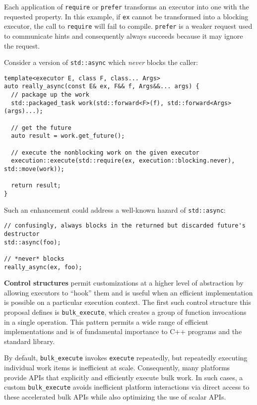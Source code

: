 \documentclass[a4paper,12pt,notitlepage,twoside,openright]{article}
\begin{document}
Each application of \texttt{require} or
\texttt{prefer} transforms an executor into one with the
requested property. In this example, if \texttt{ex} cannot
be transformed into a blocking executor, the call to
\texttt{require} will fail to compile.
\texttt{prefer} is a weaker request used to communicate
hints and consequently always succeeds because it may ignore the
request.

Consider a version of \texttt{std::async} which \emph{never}
blocks the caller:

\begin{verbatim}
template<executor E, class F, class... Args>
auto really_async(const E& ex, F&& f, Args&&... args) {
  // package up the work
  std::packaged_task work(std::forward<F>(f), std::forward<Args>(args)...);

  // get the future
  auto result = work.get_future();

  // execute the nonblocking work on the given executor
  execution::execute(std::require(ex, execution::blocking.never), std::move(work));

  return result;
}
\end{verbatim}

Such an enhancement could address a well-known hazard of
\texttt{std::async}:

\begin{verbatim}
// confusingly, always blocks in the returned but discarded future's destructor
std::async(foo);

// *never* blocks
really_async(ex, foo);
\end{verbatim}

\textbf{Control structures} permit customizations at a higher level of
abstraction by allowing executors to ``hook'' them and is useful when an
efficient implementation is possible on a particular execution context.
The first such control structure this proposal defines is
\texttt{bulk_execute}, which creates a group of function
invocations in a single operation. This pattern permits a wide range of
efficient implementations and is of fundamental importance to C++
programs and the standard library.

By default, \texttt{bulk_execute} invokes
\texttt{execute} repeatedly, but repeatedly executing
individual work items is inefficient at scale. Consequently, many
platforms provide APIs that explicitly and efficiently execute bulk
work. In such cases, a custom \texttt{bulk_execute} avoids
inefficient platform interactions via direct access to these accelerated
bulk APIs while also optimizing the use of scalar APIs.
\end{document}

